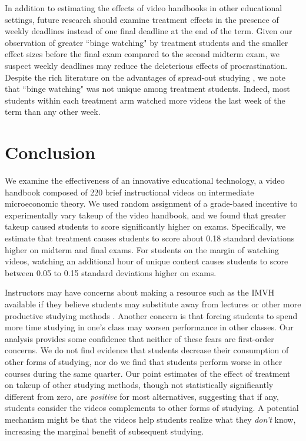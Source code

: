 \documentclass[12pt]{article}
\begin{document}
In addition to estimating the effects of video handbooks in other educational settings, future research should examine treatment effects in the presence of weekly deadlines instead of one final deadline at the end of the term. Given our observation of greater ``binge watching" by treatment students and the smaller effect sizes before the final exam compared to the second midterm exam, we suspect weekly deadlines may reduce the deleterious effects of procrastination. Despite the rich literature on the advantages of spread-out studying \parencite{kornell2009, cpvw2006}, we note that ``binge watching" was not unique among treatment students. Indeed, most students within each treatment arm watched more videos the last week of the term than any other week.


\section{Conclusion} \label{conclusion}

We examine the effectiveness of an innovative educational technology, a video handbook composed of 220 brief instructional videos on intermediate microeconomic theory. We used random assignment of a grade-based incentive to experimentally vary takeup of the video handbook, and we found that greater takeup caused students to score significantly higher on exams. Specifically, we estimate that treatment causes students to score about 0.18 standard deviations higher on midterm and final exams. For students on the margin of watching videos, watching an additional hour of unique content causes students to score between 0.05 to 0.15 standard deviations higher on exams.

Instructors may have concerns about making a resource such as the IMVH available if they believe students may substitute away from lectures or other more productive studying methods \parencite{kay2012}. Another concern is that forcing students to spend more time studying in one's class may worsen performance in other classes. Our analysis provides some confidence that neither of these fears are first-order concerns. We do not find evidence that students decrease their consumption of other forms of studying, nor do we find that students perform worse in other courses during the same quarter. Our point estimates of the effect of treatment on takeup of other studying methods, though not statistically significantly different from zero, are \textit{positive} for most alternatives, suggesting that if any, students consider the videos complements to other forms of studying. A potential mechanism might be that the videos help students realize what they \textit{don't} know, increasing the marginal benefit of subsequent studying.
\end{document}
